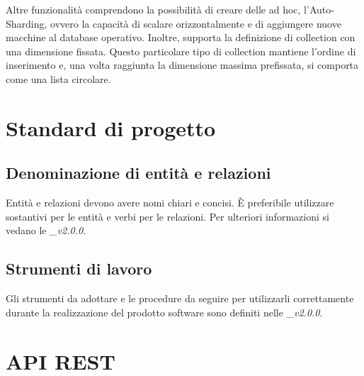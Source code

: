 \documentclass[12pt,a4paper]{article}
\begin{document}
Altre funzionalità comprendono la possibilità di creare delle  ad hoc, l’Auto-Sharding, ovvero la capacità di scalare orizzontalmente e di aggiungere nuove macchine al database operativo. Inoltre,  supporta la definizione di collection con una dimensione fissata. Questo particolare tipo di collection mantiene l’ordine di inserimento e, una volta raggiunta la dimensione massima prefissata, si comporta come una lista circolare.

\newpage
\section{Standard di progetto}



\subsection{Denominazione di entità e relazioni}
Entità e relazioni devono avere nomi chiari e concisi. È preferibile utilizzare sostantivi per le entità e verbi per le relazioni. Per ulteriori informazioni si vedano le \textit{\NdP\_v2.0.0}.

\subsection{Strumenti di lavoro}
Gli strumenti da adottare e le procedure da seguire per utilizzarli correttamente durante la realizzazione  del prodotto software sono definiti nelle \textit{\NdP\_v2.0.0}.

\newpage

\section{API REST}
%
\end{document}
